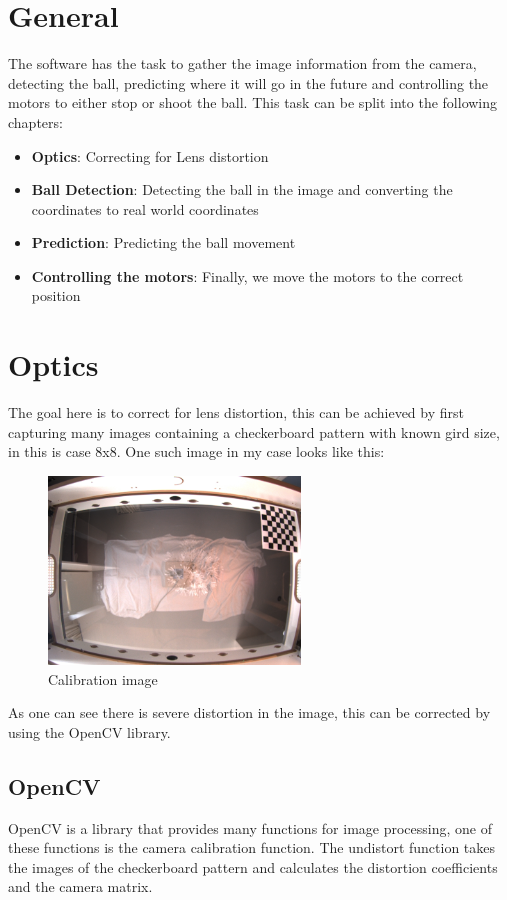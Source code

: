 \section{General}\label{sec:general}
The software has the task to gather the image information from the camera, detecting the ball, predicting where it will go in the future and controlling the motors to either stop or shoot the ball.
This task can be split into the following chapters:
\begin{itemize}
    \item \textbf{Optics}: Correcting for Lens distortion
    \item \textbf{Ball Detection}: Detecting the ball in the image and converting the coordinates to real world coordinates
    \item \textbf{Prediction}: Predicting the ball movement
    \item \textbf{Controlling the motors}: Finally, we move the motors to the correct position
\end{itemize}


\section{Optics}\label{sec:optics}
The goal here is to correct for lens distortion, this can be achieved by first capturing many images containing a checkerboard pattern with known gird size, in this is case 8x8.
One such image in my case looks like this:
\begin{figure}[H]
    \centering
    \includegraphics[height=5cm]{../photos/calibration_image}
    \caption[calimage]{Calibration image}
    \label{fig:calibration_image}
\end{figure}
As one can see there is severe distortion in the image, this can be corrected by using the OpenCV library.


\subsection{OpenCV}\label{subsec:opencv}
OpenCV is a library that provides many functions for image processing, one of these functions is the camera calibration function.
The undistort function takes the images of the checkerboard pattern and calculates the distortion coefficients and the camera matrix.

